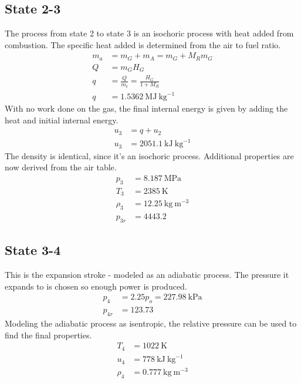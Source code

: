\documentclass[10pt,a4paper]{article}
\begin{document}
	\subsection*{State 2-3}
	The process from state 2 to state 3 is an isochoric process with heat added from combustion. The specific heat added is determined from the air to fuel ratio.
	\begin{align}
		m_a &= m_G + m_A = m_G + M_R m_G \\
		Q &= m_G H_G \\
		q &= \frac{Q}{m_t} = \frac{H_G}{1 + M_R}\\
		q &= 1.5362\ \text{MJ}\ \text{kg}^{-1}
	\end{align}
	With no work done on the gas, the final internal energy is given by adding the heat and initial internal energy.
	\begin{align}
		u_3 &= q + u_2\\
		u_3 &= 2051.1\ \text{kJ}\ \text{kg}^{-1}
	\end{align}
	The density is identical, since it's an isochoric process. Additional properties are now derived from the air table.
	\begin{align}
		p_3 &= 8.187\ \text{MPa}\\
		T_3 &= 2385\ \text{K}\\
		\rho_3 &= 12.25\ \text{kg}\ \text{m}^{-3}\\
		p_{3r} &= 4443.2
	\end{align}
	\subsection*{State 3-4}
	This is the expansion stroke - modeled as an adiabatic process. The pressure it expands to is chosen so enough power is produced.
	\begin{align}
		p_4 &= 2.25 p_o = 227.98\ \text{kPa}\\
		p_{4r} &= 123.73
	\end{align}
	Modeling the adiabatic process as isentropic, the relative pressure can be used to find the final properties.
	\begin{align}
		T_4 &= 1022\ \text{K}\\
		u_4 &= 778\ \text{kJ}\ \text{kg}^{-1}\\
		\rho_4 &= 0.777\ \text{kg}\ \text{m}^{-3}
	\end{align}
\end{document}
